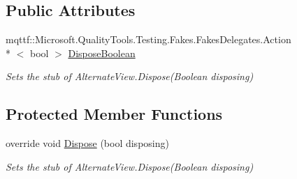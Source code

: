 \subsection*{Public Attributes}
\begin{DoxyCompactItemize}
\item 
mqttf\-::\-Microsoft.\-Quality\-Tools.\-Testing.\-Fakes.\-Fakes\-Delegates.\-Action\\*
$<$ bool $>$ \hyperlink{class_system_1_1_net_1_1_mail_1_1_fakes_1_1_stub_alternate_view_a37947b98ff7c4e15405c84a5b9a1e5d8}{Dispose\-Boolean}
\begin{DoxyCompactList}\small\item\em Sets the stub of Alternate\-View.\-Dispose(\-Boolean disposing)\end{DoxyCompactList}\end{DoxyCompactItemize}
\subsection*{Protected Member Functions}
\begin{DoxyCompactItemize}
\item 
override void \hyperlink{class_system_1_1_net_1_1_mail_1_1_fakes_1_1_stub_alternate_view_ab2ef3afb0011bffe7c855bde50691cd3}{Dispose} (bool disposing)
\begin{DoxyCompactList}\small\item\em Sets the stub of Alternate\-View.\-Dispose(\-Boolean disposing)\end{DoxyCompactList}\end{DoxyCompactItemize}
